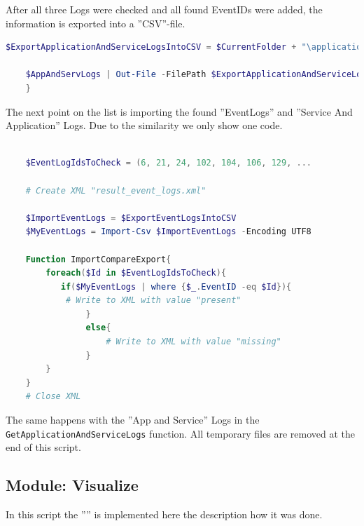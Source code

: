 \clearpage
After all three Logs were checked and all found EventIDs were added, the information is exported into a ''CSV''-file.
\begin{lstlisting}[caption=Function GetApplicationAndServiceLogs Part 2, language=PowerShell]
    $ExportApplicationAndServiceLogsIntoCSV = $CurrentFolder + "\applicationandservicelogs.csv"

    $AppAndServLogs | Out-File -FilePath $ExportApplicationAndServiceLogsIntoCSV
    }
\end{lstlisting}
The next point on the list is importing the found ''EventLogs'' and ''Service And Application'' Logs. Due to the similarity we only show one code.
\begin{lstlisting}[caption=Function ImportCompareExport, language=PowerShell]
    
    $EventLogIdsToCheck = (6, 21, 24, 102, 104, 106, 129, ...

    # Create XML "result_event_logs.xml"

    $ImportEventLogs = $ExportEventLogsIntoCSV
    $MyEventLogs = Import-Csv $ImportEventLogs -Encoding UTF8

    Function ImportCompareExport{
        foreach($Id in $EventLogIdsToCheck){
           if($MyEventLogs | where {$_.EventID -eq $Id}){
            # Write to XML with value "present"
                }
                else{
                    # Write to XML with value "missing"
                }
        }
    }
    # Close XML
\end{lstlisting}
The same happens with the ''App and Service'' Logs in the \lstinline|GetApplicationAndServiceLogs| function. All temporary files are removed at the end of this script.
\clearpage
\subsection{Module: Visualize}
In this script the '''' is implemented here the description how it was done.
